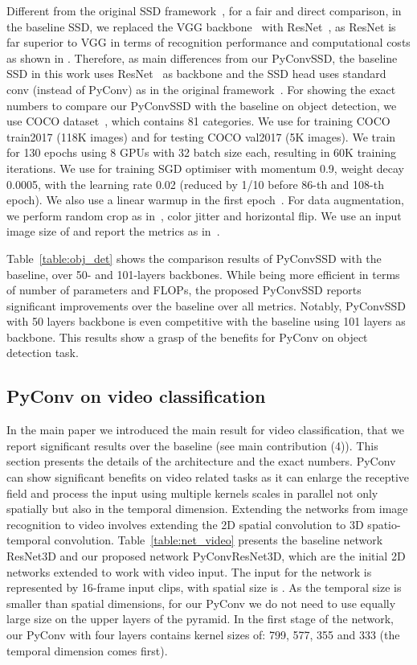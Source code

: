 \documentclass{article}
\begin{document}
Different from  the original SSD framework~\cite{liu2016ssd}, for a fair and direct comparison, in the baseline SSD,  we replaced the VGG backbone~\cite{simonyan2014very}  with ResNet~\cite{he2016deep}, as ResNet is far superior to VGG in terms of recognition performance and computational costs as shown in \cite{he2016deep}. Therefore, as main differences from our PyConvSSD, the baseline SSD in this work uses ResNet~\cite{he2016deep} as backbone and the SSD head uses standard  conv (instead of PyConv) as in the original framework~\cite{liu2016ssd}. For showing the exact numbers to compare our PyConvSSD with the baseline on object detection, we use COCO dataset~\cite{lin2014microsoft}, which contains 81 categories. We use for training COCO train2017 (118K images) and for testing COCO val2017 (5K images). We train for 130 epochs using 8 GPUs with 32 batch size each, resulting in 60K training iterations. We use for training SGD optimiser with momentum 0.9, weight decay 0.0005, with the learning rate 0.02 (reduced by 1/10 before 86-th and 108-th epoch). We also use a linear warmup in the first epoch~\cite{goyal2017accurate}. For data augmentation, we perform random crop as in~\cite{liu2016ssd}, color jitter and horizontal flip. We use an input image size of   and report the metrics as in~\cite{liu2016ssd}.

Table~\ref{table:obj_det} shows the comparison results of PyConvSSD with the baseline, over 50- and 101-layers backbones.  While being more efficient in terms of number of parameters and FLOPs, the proposed PyConvSSD reports significant improvements over the baseline over all metrics. Notably, PyConvSSD with 50 layers backbone is even competitive with the baseline using 101 layers as backbone. This results show a grasp of the benefits for PyConv on object detection task.




\subsection{PyConv on video classification\label{sec:vid}}
In the main paper we introduced the main result for video classification, that we report significant results over the baseline (see main contribution (4)). This section presents the details of the architecture and the exact numbers. 
PyConv can show significant benefits on video related tasks as it can enlarge the receptive field and process the input using multiple kernels scales in parallel not only spatially but also in the temporal dimension.  Extending the networks from image recognition to video involves extending the 2D spatial convolution to 3D spatio-temporal convolution. Table~\ref{table:net_video} presents the baseline network ResNet3D and our proposed network PyConvResNet3D, which are the initial 2D networks extended to work with video input. The input for the network is represented by 16-frame input clips, with spatial  size  is . As the temporal size is smaller than spatial dimensions, for our PyConv we do not need to use equally large size on the upper layers of the pyramid. In the first stage of the network, our PyConv with four layers contains kernel sizes of:  799, 577, 355 and 333 (the temporal dimension comes first).
\end{document}
